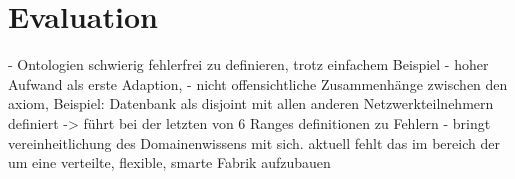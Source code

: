 \chapter{Evaluation}
- Ontologien schwierig fehlerfrei zu definieren, trotz einfachem Beispiel
- hoher Aufwand als erste Adaption, 
- nicht offensichtliche Zusammenhänge zwischen den \Gls{axiom}, Beispiel: Datenbank als disjoint mit allen anderen Netzwerkteilnehmern definiert -> führt bei der letzten von 6 Ranges definitionen zu Fehlern
- bringt vereinheitlichung des Domainenwissens mit sich. aktuell fehlt das im bereich der  um eine verteilte, flexible, smarte Fabrik aufzubauen